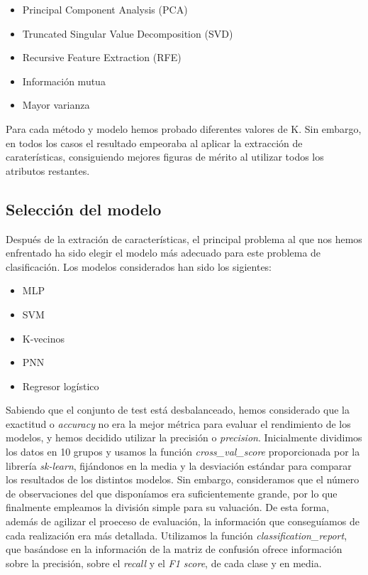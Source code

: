 \documentclass[journal,twoside]{JoPhA}
\begin{document}
\begin{itemize}
	\item Principal Component Analysis (PCA)
	\item Truncated Singular Value Decomposition (SVD)
	\item Recursive Feature Extraction (RFE)
	\item Información mutua
	\item Mayor varianza \\
\end{itemize}

Para cada método y modelo hemos probado diferentes valores de K. Sin embargo, en todos los casos el resultado empeoraba al aplicar la extracción de caraterísticas, consiguiendo mejores figuras de mérito al utilizar todos los atributos restantes. \\

\subsection{Selección del modelo}
Después de la extración de características, el principal problema al que nos hemos enfrentado ha sido elegir el modelo más adecuado para este problema de clasificación. Los modelos considerados han sido los sigientes: \\

\begin{itemize}
	\item MLP
	\item SVM
	\item K-vecinos
	\item PNN
	\item Regresor logístico \\
\end{itemize} 

Sabiendo que el conjunto de test está desbalanceado, hemos considerado que la exactitud o \textit{accuracy} no era la mejor métrica para evaluar el rendimiento de los modelos, y hemos decidido utilizar la precisión o \textit{precision}. Inicialmente dividimos los datos en 10 grupos y usamos la función \textit{cross\_val\_score} proporcionada por la librería \emph{sk-learn}\cite{validacion_cruzada}, fijándonos en la media y la desviación estándar para comparar los resultados de los distintos modelos. Sin embargo, consideramos que el número de observaciones del que disponíamos era suficientemente grande, por lo que finalmente empleamos la división simple para su valuación. De esta forma, además de agilizar el proeceso de evaluación, la información que conseguíamos de cada realización era más detallada. Utilizamos la función \textit{classification\_report}, que basándose en la información de la matriz de confusión ofrece información sobre la precisión, sobre el \textit{recall} y el \textit{F1 score}, de cada clase y en media. \\
\end{document}
